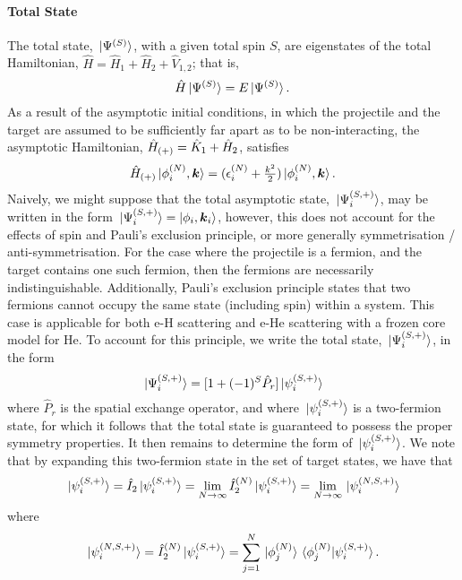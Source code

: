 \documentclass[draft]{article}
\begin{document}
\paragraph{Total State}

The total state, $\ket*{\Psi^{(S)}}$, with a given total spin $S$, are
eigenstates of the total Hamiltonian,
$\hat{H} = \hat{H}_{1} + \hat{H}_{2} + \hat{V}_{1, 2}$; that is,
\begin{equation}
  \label{eq:total-hamiltonian}
  \hat{H}
  \ket*{\Psi^{(S)}}
  =
  E
  \ket*{\Psi^{(S)}}
  .
\end{equation}
As a result of the asymptotic initial conditions, in which the projectile and
the target are assumed to be sufficiently far apart as to be non-interacting,
the asymptotic Hamiltonian, $\hat{H}_{(+)} = \hat{K}_{1} + \hat{H}_{2}$,
satisfies
\begin{equation}
  \label{eq:total-asymptotic-hamiltonian}
  \hat{H}_{(+)}
  \ket*{\phi_{i}^{(N)}, \boldsymbol{k}}
  =
  (
    \epsilon_{i}^{(N)}
    +
    \tfrac{k^{2}}{2}
  )
  \ket*{\phi_{i}^{(N)}, \boldsymbol{k}}
  .
\end{equation}
Naively, we might suppose that the total asymptotic state,
$\ket*{\Psi_{i}^{(S, +)}}$, may be written in the form
$\ket*{\Psi_{i}^{(S, +)}} = \ket{\phi_{i}, \boldsymbol{k}_{i}}$,
however, this does not account for the effects of spin and Pauli's exclusion
principle, or more generally symmetrisation / anti-symmetrisation.
For the case where the projectile is a fermion, and the target contains one such
fermion, then the fermions are necessarily indistinguishable.
Additionally, Pauli's exclusion principle states that two fermions cannot occupy
the same state (including spin) within a system.
This case is applicable for both e-H scattering and e-He scattering with a
frozen core model for He.
To account for this principle, we write the total state,
$\ket*{\Psi_{i}^{(S, +)}}$, in the form
\begin{equation}
  \label{eq:total-state-symmetrisation}
  \ket*{\Psi_{i}^{(S, +)}}
  =
  [
    1
    +
    (-1)^{S}
    \hat{P}_{r}
  ]
  \ket*{\psi_{i}^{(S, +)}}
\end{equation}
where $\hat{P}_{r}$ is the spatial exchange operator, and where
$\ket*{\psi_{i}^{(S, +)}}$ is a two-fermion state, for which it follows that
the total state is guaranteed to possess the proper symmetry properties.
It then remains to determine the form of $\ket*{\psi_{i}^{(S, +)}}$.
We note that by expanding this two-fermion state in the set of target states, we
have that
\begin{equation}
  \label{eq:target-expansion}
  \ket*{\psi_{i}^{(S, +)}}
  =
  \hat{I}_{2}
  \ket*{\psi_{i}^{(S, +)}}
  =
  \lim_{N \to \infty}
  \hat{I}_{2}^{(N)}
  \ket*{\psi_{i}^{(S, +)}}
  =
  \lim_{N \to \infty}
  \ket*{\psi_{i}^{(N, S, +)}}
\end{equation}
where
\begin{equation}
  \label{eq:target-expansion-2}
  \ket*{\psi_{i}^{(N, S, +)}}
  =
  \hat{I}_{2}^{(N)}
  \ket*{\psi_{i}^{(S, +)}}
  =
  \sum_{j = 1}^{N}
  \ket*{\phi_{j}^{(N)}}
  \bra*{\phi_{j}^{(N)}}
  \ket*{\psi_{i}^{(S, +)}}
  .
\end{equation}
\end{document}
